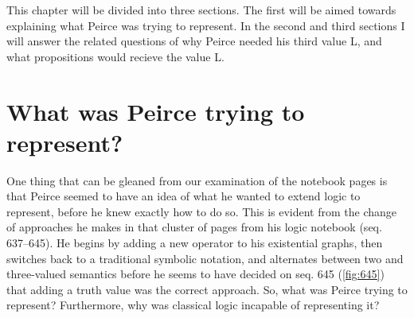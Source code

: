 This chapter will be divided into three sections. The first will be aimed towards explaining what Peirce was trying to represent. In the second and third sections I will answer the related questions of why Peirce needed his third value L, and what propositions would recieve the value L.



\section{What was Peirce trying to represent?}

One thing that can be gleaned from our examination of the notebook pages is that Peirce seemed to have an idea of what he wanted to extend logic to represent, before he knew exactly how to do so. This is evident from the change of approaches he makes in that cluster of pages from his logic notebook (seq. 637--645). He begins by adding a new operator to his existential graphs, then switches back to a traditional symbolic notation, and alternates between two and three-valued semantics before he seems to have decided on seq. 645 (\ref{fig:645}) that adding a truth value was the correct approach. So, what was Peirce trying to represent? Furthermore, why was classical logic incapable of representing it?

